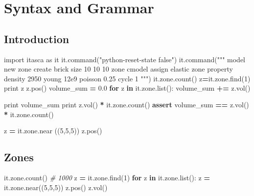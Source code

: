 \documentclass[a4paper, nobind]{templates/ociamthesis}
\newenvironment{Shaded}{\begin{snugshade}}{\end{snugshade}}
\newcommand{\BuiltInTok}[1]{#1}
\newcommand{\CommentTok}[1]{\textcolor[rgb]{0.56,0.35,0.01}{\textit{#1}}}
\newcommand{\ControlFlowTok}[1]{\textcolor[rgb]{0.13,0.29,0.53}{\textbf{#1}}}
\newcommand{\DecValTok}[1]{\textcolor[rgb]{0.00,0.00,0.81}{#1}}
\newcommand{\FloatTok}[1]{\textcolor[rgb]{0.00,0.00,0.81}{#1}}
\newcommand{\ImportTok}[1]{#1}
\newcommand{\KeywordTok}[1]{\textcolor[rgb]{0.13,0.29,0.53}{\textbf{#1}}}
\newcommand{\NormalTok}[1]{#1}
\newcommand{\OperatorTok}[1]{\textcolor[rgb]{0.81,0.36,0.00}{\textbf{#1}}}
\newcommand{\StringTok}[1]{\textcolor[rgb]{0.31,0.60,0.02}{#1}}
\renewenvironment{Shaded}
{
  \vspace{10pt}%
  \begin{snugshade}%
}{%
  \end{snugshade}%
  \vspace{8pt}%
}
\begin{document}
\newpage

\hypertarget{syntax-and-grammar}{%
\chapter{Syntax and Grammar}\label{syntax-and-grammar}}

\hypertarget{introduction}{%
\section{Introduction}\label{introduction}}

\begin{Shaded}
\begin{Highlighting}[]
\ImportTok{import}\NormalTok{ itasca }\ImportTok{as}\NormalTok{ it}
\NormalTok{it.command(}\StringTok{"python{-}reset{-}state false"}\NormalTok{)}
\NormalTok{it.command(}\StringTok{"""}
\StringTok{model new}
\StringTok{zone create brick size 10 10 10}
\StringTok{zone cmodel assign elastic}
\StringTok{zone property density 2950 young 12e9 poisson 0.25}
\StringTok{cycle 1}
\StringTok{"""}\NormalTok{)}
\NormalTok{it.zone.count()}
\NormalTok{z}\OperatorTok{=}\NormalTok{it.zone.find(}\DecValTok{1}\NormalTok{)}
\BuiltInTok{print}\NormalTok{ z}
\NormalTok{z.pos()}
\NormalTok{volume\_sum }\OperatorTok{=} \FloatTok{0.0}
\ControlFlowTok{for}\NormalTok{ z }\KeywordTok{in}\NormalTok{ it.zone.}\BuiltInTok{list}\NormalTok{():}
\NormalTok{  volume\_sum }\OperatorTok{+=}\NormalTok{ z.vol()}

\BuiltInTok{print}\NormalTok{ volume\_sum}
\BuiltInTok{print}\NormalTok{ z.vol() }\OperatorTok{*}\NormalTok{ it.zone.count()}
\ControlFlowTok{assert}\NormalTok{ volume\_sum }\OperatorTok{==}\NormalTok{ z.vol() }\OperatorTok{*}\NormalTok{ it.zone.count()}

\NormalTok{z }\OperatorTok{=}\NormalTok{ it.zone.near ((}\DecValTok{5}\NormalTok{,}\DecValTok{5}\NormalTok{,}\DecValTok{5}\NormalTok{))}
\NormalTok{z.pos()}
\end{Highlighting}
\end{Shaded}

\hypertarget{zones-3}{%
\section{Zones}\label{zones-3}}

\begin{Shaded}
\begin{Highlighting}[]
\NormalTok{it.zone.count() }\CommentTok{\# 1000}
\NormalTok{z }\OperatorTok{=}\NormalTok{ it.zone.find(}\DecValTok{1}\NormalTok{)}
\ControlFlowTok{for}\NormalTok{ z }\KeywordTok{in}\NormalTok{ it.zone.}\BuiltInTok{list}\NormalTok{():}
\NormalTok{  z }\OperatorTok{=}\NormalTok{ it.zone.near((}\DecValTok{5}\NormalTok{,}\DecValTok{5}\NormalTok{,}\DecValTok{5}\NormalTok{))}
\NormalTok{z.pos()}
\NormalTok{z.vol()}
\end{Highlighting}
\end{Shaded}
\end{document}
